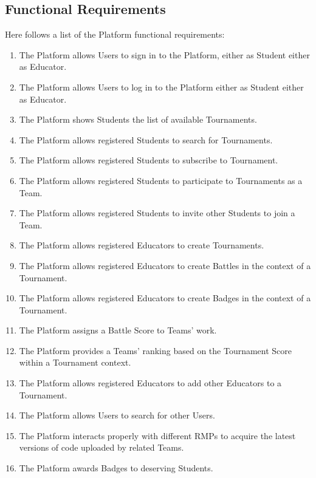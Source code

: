 \newpage

\subsection{Functional Requirements}
Here follows a list of the Platform functional requirements:
\begin{enumerate}[label= \textbf{R\arabic*}]
    \item The Platform allows Users to sign in to the Platform, either as Student either as Educator. \label{req:reqSignin}
    \item The Platform allows Users to log in to the Platform either as Student either as Educator. \label{req:reqLogin}
    \item The Platform shows Students the list of available Tournaments. \label{req:reqShowTournaments}
    \item The Platform allows registered Students to search for Tournaments. \label{req:reqSearchForTournament}
    \item The Platform allows registered Students to subscribe to Tournament. \label{req:reqTournamentSubscription}
    \item The Platform allows registered Students to participate to Tournaments as a Team. \label{req:reqCreateTeam}
    \item The Platform allows registered Students to invite other Students to join a Team. \label{req:reqJoinTeam}
    \item The Platform allows registered Educators to create Tournaments. \label{req:reqCreateTournaments}
    \item The Platform allows registered Educators to create Battles in the context of a Tournament. \label{req:reqCreateBattle}
    \item The Platform allows registered Educators to create Badges in the context of a Tournament. \label{req:reqCreateBadge}
    \item The Platform assigns a Battle Score to Teams' work. \label{req:reqEvaluateCode}
    \item The Platform provides a Teams' ranking based on the Tournament Score within a Tournament context. \label{req:reqRankingsUpdate}
    \item The Platform allows registered Educators to add other Educators to a Tournament. \label{req:reqJoinManagement}
    \item The Platform allows Users to search for other Users. \label{req:reqSearchForUsers}
    \item The Platform interacts properly with different RMPs to acquire the latest versions of code uploaded by related Teams. \label{req:reqPullRMP}
    \item The Platform awards Badges to deserving Students. \label{req:reqAssignBadge}
\end{enumerate}


